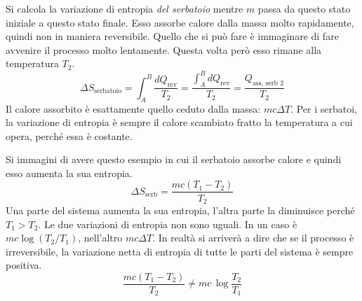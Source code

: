 \documentclass[10pt,a4paper]{book}
\begin{document}
\FloatBarrier
Si calcola la variazione di entropia \emph{del serbatoio} mentre $m$ passa da questo stato iniziale a questo stato finale. Esso assorbe calore dalla massa molto rapidamente, quindi non in maniera reversibile. Quello che si può fare è immaginare di fare avvenire il processo molto lentamente. Questa volta però esso rimane alla temperatura $T_2$.
\[
	\Delta S_{\text{serbatoio}} = \int_A^B \frac{dQ_{\text{rev}} }{T_2} = \frac{\int_A^B dQ_{\text{rev} } }{T_2 } = \frac{Q_{\text{ass, serb }2 } }{T_2}
\]
Il calore assorbito è esattamente quello ceduto dalla massa: $mc\Delta T$. Per i serbatoi, la variazione di entropia è sempre il calore scambiato fratto la temperatura a cui opera, perché essa è costante.

Si immagini di avere questo esempio in cui il serbatoio assorbe calore e quindi esso aumenta la sua entropia.
\[
	\Delta S_{\text{serb} } = \frac{mc(T_1-T_2)}{T_2}
\]
Una parte del sistema aumenta la sua entropia, l'altra parte la diminuisce perché $T_1>T_2$. Le due variazioni di entropia non sono uguali. In un caso è $mc\log(T_2/T_1)$, nell'altro $mc\Delta T$. In realtà si arriverà a dire che se il processo è irreversibile, la variazione netta di entropia di tutte le parti del sistema è sempre positiva.
\[
	\frac{mc(T_1-T_2  )}{T_2 } \neq mc\,\log \frac{T_2 }{T_1}
\]
\end{document}
